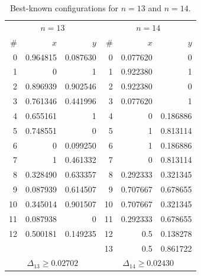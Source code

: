 \documentclass[11pt,a4paper]{article}
\theoremstyle{plain}
\theoremstyle{definition}
\theoremstyle{remark}
\begin{document}
\begin{table}[ht]
\centering
\caption{Best-known configurations for $n=13$ and $n=14$.}
\label{tab:bestknown-1314}
{\small
\begin{tabular}{r r@{\hskip 6pt} r @{\hskip 14pt} r r@{\hskip 6pt} r}
\toprule
\multicolumn{3}{c}{$n=13$} & \multicolumn{3}{c}{$n=14$} \\
\# & $x$ & $y$ & \# & $x$ & $y$ \\
\midrule
0 & 0.964815 & 0.087630 & 0 & 0.077620 & 0 \\
1 & 0 & 1               & 1 & 0.922380 & 1 \\
2 & 0.896939 & 0.902546 & 2 & 0.922380 & 0 \\
3 & 0.761346 & 0.441996 & 3 & 0.077620 & 1 \\
4 & 0.655161 & 1         & 4 & 0 & 0.186886 \\
5 & 0.748551 & 0         & 5 & 1 & 0.813114 \\
6 & 0 & 0.099250         & 6 & 1 & 0.186886 \\
7 & 1 & 0.461332         & 7 & 0 & 0.813114 \\
8 & 0.328490 & 0.633357 & 8 & 0.292333 & 0.321345 \\
9 & 0.087939 & 0.614507 & 9 & 0.707667 & 0.678655 \\
10 & 0.345014 & 0.901507 & 10 & 0.707667 & 0.321345 \\
11 & 0.087938 & 0         & 11 & 0.292333 & 0.678655 \\
12 & 0.500181 & 0.149235 & 12 & 0.5 & 0.138278 \\
   &          &           & 13 & 0.5 & 0.861722 \\
\midrule
\multicolumn{3}{c}{$\Delta_{13} \ge 0.02702$}
& \multicolumn{3}{c}{$\Delta_{14} \ge 0.02430$} \\
\bottomrule
\end{tabular}}
\end{table}
\end{document}

